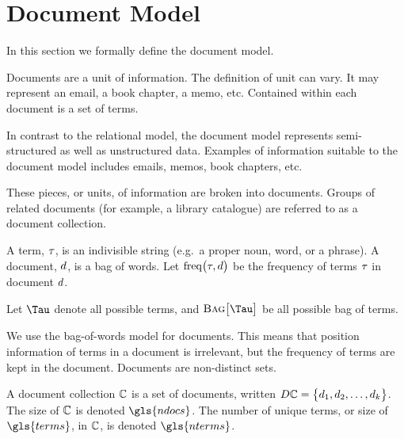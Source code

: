 \section{Document Model}
\label{sec:document-model}
	In this section we formally define the document model.
	
	Documents are a unit of information.  The definition of unit can vary.	It may represent an email, a book chapter, a memo, etc.	 Contained within each document is a set of terms.
	
	In contrast to the relational model, the document model represents semi-structured as well as unstructured data.  Examples of information suitable to the document model includes emails, memos, book chapters, etc.
	
	These pieces, or units, of information are broken into documents.  Groups of related documents (for example, a library catalogue) are referred to as a document collection.

	\begin{defn}
	\label{def:document}
		A term, $\tau$, is an indivisible string (e.g.~a proper noun, word, or a phrase).	A document, $d$, is a bag of words.	Let $\operatorname{freq}\bigl(\tau, d\bigr)$ be the frequency of terms $\tau$ in document $d$.
		
		Let $\terms$ denote all possible terms, and $\bag{\terms}$ be all possible bag of terms.
	\end{defn}
	
	\begin{remark}
		We use the bag-of-words model for documents.  This means that position information of terms in a document is irrelevant, but the frequency of terms are kept in the document.  Documents are non-distinct sets.
	\end{remark}
	
	\begin{defn}
	\label{def:document-collection}
		A document collection $\mathbb{C}$ is a set of documents, written $D\mathbb{C} = \bigl\{d_1, d_2, \dotsc, d_k\bigr\}$.  The size of $\mathbb{C}$ is denoted $\gls{ndocs}$.	The number of unique terms, or size of $\gls{terms}$, in $\mathbb{C}$, is denoted $\gls{nterms}$.
	\end{defn}
	
